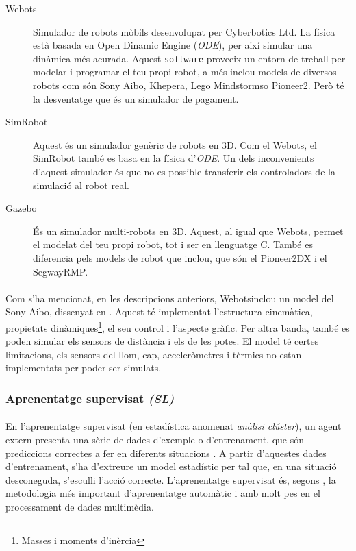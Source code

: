 \documentclass[12pt,a4paper,final,twoside]{article}
\begin{document}
\begin{description}
\item[Webots\texttrademark] \cite{Michel2004} Simulador de robots mòbils desenvolupat per Cyberbotics Ltd. La física està basada en Open Dinamic Engine (\textit{ODE}), per així simular una dinàmica més acurada. Aquest \texttt{software} proveeix un entorn de treball per modelar i programar el teu propi robot, a més inclou models de diversos robots com són Sony Aibo, Khepera, Lego Mindstorms\texttrademark o Pioneer2. Però té la desventatge que és un simulador de pagament.

\item[SimRobot] \cite{Laue2006a} Aquest és un simulador genèric de robots en 3D. Com el Webots\texttrademark , el SimRobot també es basa en la física d'\textit{ODE}. Un dels inconvenients d'aquest simulador és que no es possible transferir els controladors de la simulació al robot real.

\item[Gazebo] \cite{Khatib2002} És un simulador multi-robots en 3D. Aquest, al igual que Webots\texttrademark , permet el modelat del teu propi robot, tot i ser en llenguatge C. També es diferencia pels models de robot que inclou, que són el Pioneer2DX i el SegwayRMP.
\end{description}

\paragraph{}Com s'ha mencionat, en les descripcions anteriors, Webots\texttrademark inclou un model del Sony Aibo, dissenyat en \cite{Hohl2006}. Aquest té implementat l'estructura cinemàtica, propietats dinàmiques\footnote{Masses i moments d'inèrcia}, el seu control i l'aspecte gràfic. Per altra banda, també es poden simular els sensors de distància i els de les potes. El model té certes limitacions, els sensors del llom, cap, acceleròmetres i tèrmics no estan implementats per poder ser simulats. 


\subsubsection{Aprenentatge supervisat \textit{(SL)}}

\paragraph{}En l'aprenentatge supervisat (en estadística anomenat \textit{anàlisi clúster}), un agent extern presenta una sèrie de dades d'exemple o d'entrenament, que són prediccions correctes a fer en diferents situacions \cite{Kober2009}. A partir d'aquestes dades d'entrenament, s'ha d'extreure un model estadístic per tal que, en una situació desconeguda, s'esculli l'acció correcte. L'aprenentatge supervisat és, segons \cite{Cord2008}, la metodologia més important d'aprenentatge automàtic i amb molt pes en el processament de dades multimèdia.
\end{document}
